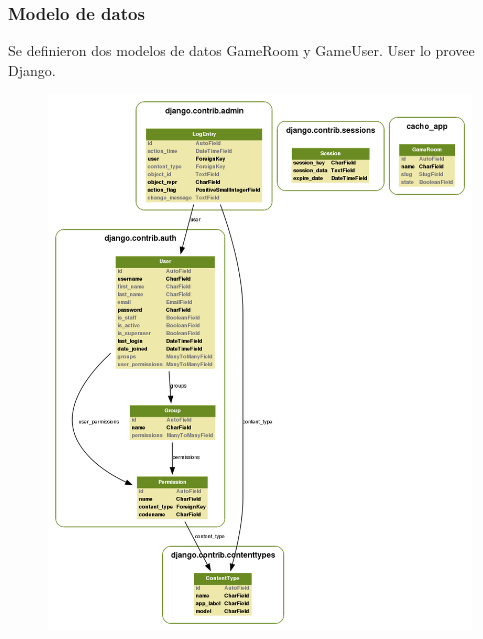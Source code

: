 \documentclass[a4paper,11pt]{article}
\begin{document}
\subsubsection{Modelo de datos}
Se definieron dos modelos de datos GameRoom y GameUser. User lo provee Django.
\begin{figure}[h!]
	\centering
	\includegraphics[width=\textwidth]{md.png}
\end{figure}

\newpage
\end{document}
